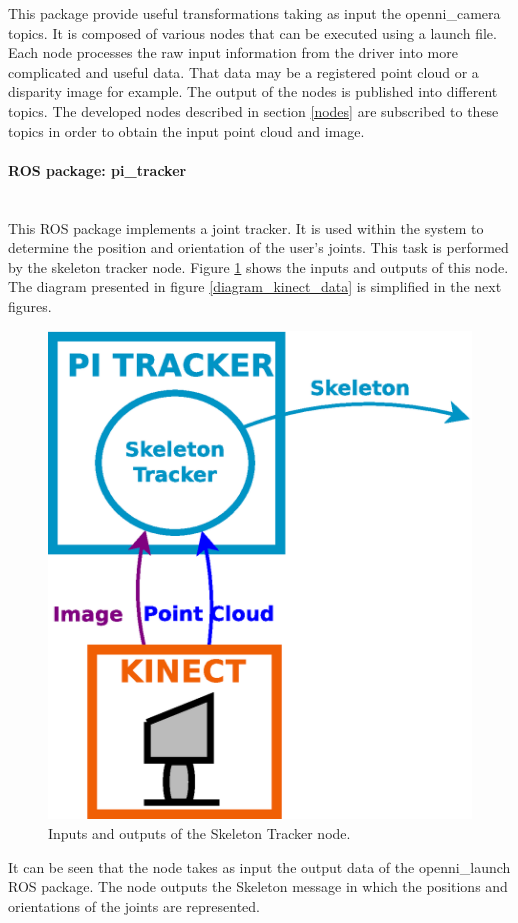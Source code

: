This package provide useful transformations taking as input the openni\_camera topics. %
It is composed of various nodes that can be executed using a launch file. 
Each node processes the raw input information from the driver into more complicated and useful data. 
That data may be a registered point cloud or a disparity image for example. 
The output of the nodes is published into different topics. 
The developed nodes described in section \ref{nodes} are subscribed to these topics in order to obtain the input point cloud and image. 



\paragraph{ROS package: pi\_tracker}\mbox{}\\

This ROS package implements a joint tracker.
It is used within the system to determine the position and orientation of the user's joints. 
This task is performed by the skeleton tracker node.  
Figure \ref{diagram_skeleton} shows the inputs and outputs of this node. 
The diagram presented in figure \ref{diagram_kinect_data} is simplified in the next figures.  

		\begin{figure}[H]
			\begin{center}
			\includegraphics[width=0.3\linewidth]{img/diagrams/node_pi_tracker.eps}
			\caption[Skeleton Tracker I/O]{Inputs and outputs of the Skeleton Tracker node.}
			\label{diagram_skeleton}
			\end{center}
		\end{figure}

It can be seen that the node takes as input the output data of the openni\_launch ROS package. 
The node outputs the Skeleton message in which the positions and orientations of the joints are represented. 



\newpage
